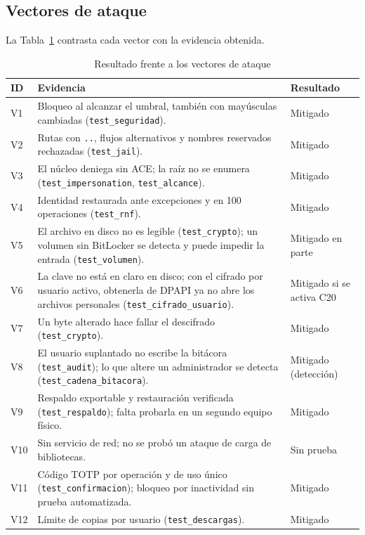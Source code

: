 \documentclass[conference]{IEEEtran}
\begin{document}
\subsection{Vectores de ataque}
La Tabla~\ref{tab:vecres} contrasta cada vector con la evidencia obtenida.

\begin{table}[!t]
\caption{Resultado frente a los vectores de ataque}
\label{tab:vecres}
\centering
\footnotesize
\setlength{\tabcolsep}{3pt}
\begin{tabular}{|l|p{4.5cm}|p{1.85cm}|}
\hline
\textbf{ID} & \textbf{Evidencia} & \textbf{Resultado} \\
\hline
V1 & Bloqueo al alcanzar el umbral, también con mayúsculas cambiadas (\texttt{test\_seguridad}). & Mitigado \\
\hline
V2 & Rutas con \texttt{..}, flujos alternativos y nombres reservados rechazadas (\texttt{test\_jail}). & Mitigado \\
\hline
V3 & El núcleo deniega sin ACE; la raíz no se enumera (\texttt{test\_impersonation}, \texttt{test\_alcance}). & Mitigado \\
\hline
V4 & Identidad restaurada ante excepciones y en 100 operaciones (\texttt{test\_rnf}). & Mitigado \\
\hline
V5 & El archivo en disco no es legible (\texttt{test\_crypto}); un volumen sin BitLocker se detecta y puede impedir la entrada (\texttt{test\_volumen}). & Mitigado en parte \\
\hline
V6 & La clave no está en claro en disco; con el cifrado por usuario activo, obtenerla de DPAPI ya no abre los archivos personales (\texttt{test\_cifrado\_usuario}). & Mitigado si se activa C20 \\
\hline
V7 & Un byte alterado hace fallar el descifrado (\texttt{test\_crypto}). & Mitigado \\
\hline
V8 & El usuario suplantado no escribe la bitácora (\texttt{test\_audit}); lo que altere un administrador se detecta (\texttt{test\_cadena\_bitacora}). & Mitigado (detección) \\
\hline
V9 & Respaldo exportable y restauración verificada (\texttt{test\_respaldo}); falta probarla en un segundo equipo físico. & Mitigado \\
\hline
V10 & Sin servicio de red; no se probó un ataque de carga de bibliotecas. & Sin prueba \\
\hline
V11 & Código TOTP por operación y de uso único (\texttt{test\_confirmacion}); bloqueo por inactividad sin prueba automatizada. & Mitigado \\
\hline
V12 & Límite de copias por usuario (\texttt{test\_descargas}). & Mitigado \\
\hline
\end{tabular}
\end{table}
\end{document}
